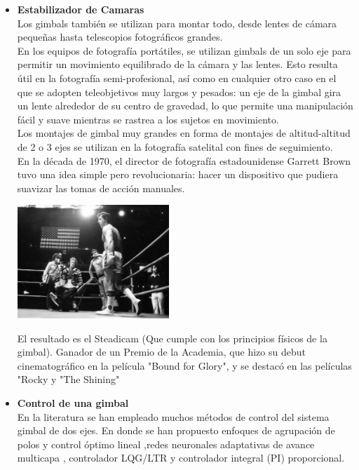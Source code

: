 \begin{itemize}
	\item \textbf{Estabilizador de Camaras}\\
	      Los gimbals también se utilizan para montar todo, desde lentes de cámara pequeñas
	      hasta telescopios fotográficos grandes.\\
	      En los equipos de fotografía portátiles, se utilizan gimbals de un
	      solo eje para permitir un movimiento equilibrado de la cámara y las lentes.
	      Esto resulta útil en la fotografía semi-profesional, así como en cualquier otro
	      caso en el que se adopten teleobjetivos muy largos y pesados: un eje de la gimbal
	      gira un lente alrededor de su centro de gravedad, lo que permite una manipulación
	      fácil y suave mientras se rastrea a los sujetos en movimiento.\\
	      Los montajes de gimbal muy grandes en forma de montajes de altitud-altitud de 2 o 3 ejes
	      se utilizan en la fotografía satelital con fines de seguimiento.\\
	      En la década de 1970, el director de fotografía estadounidense Garrett Brown tuvo
	      una idea simple pero revolucionaria: hacer un dispositivo que pudiera suavizar las
	      tomas de acción manuales.
	      \begin{center}
		      \includegraphics[width=0.45\textwidth]{Contenido/Cuerpo/Capitulo1/Fig4.eps}
		      \label{fig:Introduccion:Fig5}
	      \end{center}

	      El resultado es el Steadicam (Que cumple con los principios físicos de la gimbal).
	      Ganador de un Premio de la Academia, que hizo su debut cinematográfico en la
	      película "Bound for Glory", y se destacó en las películas "Rocky y "The Shining"

	\item \textbf{Control de una gimbal}\\
		  En la literatura se han empleado muchos métodos de control del sistema gimbal de dos ejes. En donde se han propuesto enfoques de agrupación de polos y control óptimo 
		  lineal \cite{Paper::Salatun1983},redes neuronales adaptativas de avance multicapa \cite{Paper::Lin2001}, controlador LQG/LTR \cite{Paper::Lee2006} y controlador integral 
		  (PI) proporcional\cite{Paper::Kim2010}.

\end{itemize}


